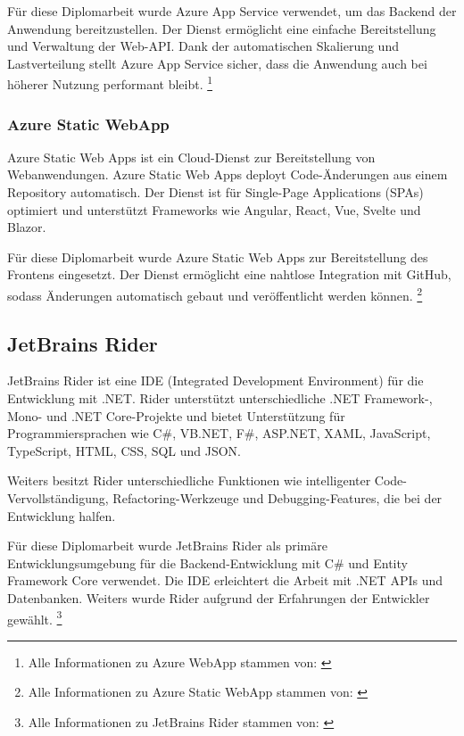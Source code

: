 Für diese Diplomarbeit wurde Azure App Service verwendet, um das Backend der 
Anwendung bereitzustellen. Der Dienst ermöglicht eine einfache Bereitstellung 
und Verwaltung der Web-API. Dank der automatischen Skalierung und Lastverteilung 
stellt Azure App Service sicher, dass die Anwendung auch bei höherer Nutzung 
performant bleibt.
\footnote{Alle Informationen zu Azure WebApp stammen von: \cite{MicrosoftCorporationy}}

\subsubsection{Azure Static WebApp}
\label{subsection:azure_static_web_app}

Azure Static Web Apps ist ein Cloud-Dienst zur Bereitstellung von Webanwendungen. 
Azure Static Web Apps deployt Code-Änderungen aus einem Repository automatisch. Der Dienst 
ist für Single-Page Applications (SPAs) optimiert und unterstützt Frameworks wie Angular, 
React, Vue, Svelte und Blazor.

Für diese Diplomarbeit wurde Azure Static Web Apps zur Bereitstellung des Frontens 
eingesetzt. Der Dienst ermöglicht eine nahtlose Integration mit GitHub, sodass Änderungen 
automatisch gebaut und veröffentlicht werden können.
\footnote{Alle Informationen zu Azure Static WebApp stammen von: \cite{MicrosoftCorporationz}}

\subsection{JetBrains Rider}
\label{subsection:jetbrains-rider}

JetBrains Rider ist eine IDE (Integrated Development Environment) für die Entwicklung mit .NET. 
Rider unterstützt unterschiedliche .NET Framework-, Mono- und .NET Core-Projekte und bietet 
Unterstützung für Programmiersprachen wie C\#, VB.NET, F\#, ASP.NET, XAML, JavaScript, 
TypeScript, HTML, CSS, SQL und JSON.

Weiters besitzt Rider unterschiedliche Funktionen wie intelligenter Code-Vervollständigung, 
Refactoring-Werkzeuge und Debugging-Features, die bei der Entwicklung halfen. 

Für diese Diplomarbeit wurde JetBrains Rider als primäre Entwicklungsumgebung für die 
Backend-Entwicklung mit C\# und Entity Framework Core verwendet. Die IDE erleichtert 
die Arbeit mit .NET APIs und Datenbanken. Weiters wurde Rider aufgrund der 
Erfahrungen der Entwickler gewählt.
\footnote{Alle Informationen zu JetBrains Rider stammen von: \cite{JetBrains}}

